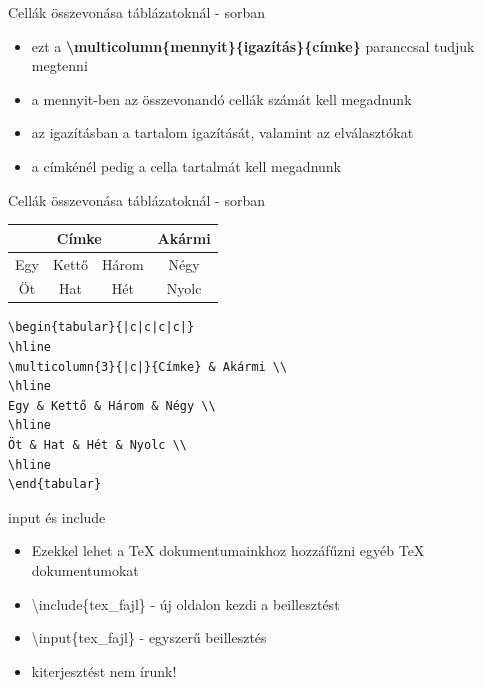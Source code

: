 \documentclass[11pt]{beamer}
\newcommand{\tbs}{\textbackslash}
\begin{document}
\begin{frame}{Cellák összevonása táblázatoknál - sorban}
\begin{itemize}
\item ezt a \textbf{\tbs multicolumn\{mennyit\}\{igazítás\}\{címke\}} paranccsal tudjuk megtenni
\item a mennyit-ben az összevonandó cellák számát kell megadnunk
\item az igazításban a tartalom igazítását, valamint az elválasztókat
\item a címkénél pedig a cella tartalmát kell megadnunk
\end{itemize}
\end{frame}
\begin{frame}[fragile]{Cellák összevonása táblázatoknál - sorban}
\begin{center}
\begin{tabular}{|c|c|c|c|}
\hline 
\multicolumn{3}{|c|}{Címke} & Akármi \\ 
\hline 
Egy & Kettő & Három & Négy \\ 
\hline 
Öt & Hat & Hét & Nyolc \\ 
\hline 
\end{tabular}
\end{center}
\vspace{0.5cm}
\begin{verbatim}
\begin{tabular}{|c|c|c|c|}
\hline 
\multicolumn{3}{|c|}{Címke} & Akármi \\ 
\hline 
Egy & Kettő & Három & Négy \\ 
\hline 
Öt & Hat & Hét & Nyolc \\ 
\hline 
\end{tabular} 
\end{verbatim}
\end{frame}
 
\begin{frame}{input és include}
\begin{itemize}
\item	Ezekkel lehet a \TeX{} dokumentumainkhoz hozzáfűzni egyéb \TeX{} dokumentumokat
\item	\tbs include\{tex\_fajl\} - új oldalon kezdi a beillesztést
\item	\tbs input\{tex\_fajl\} - egyszerű beillesztés
\item	kiterjesztést nem írunk!
\end{itemize}
\end{frame}
\end{document}

